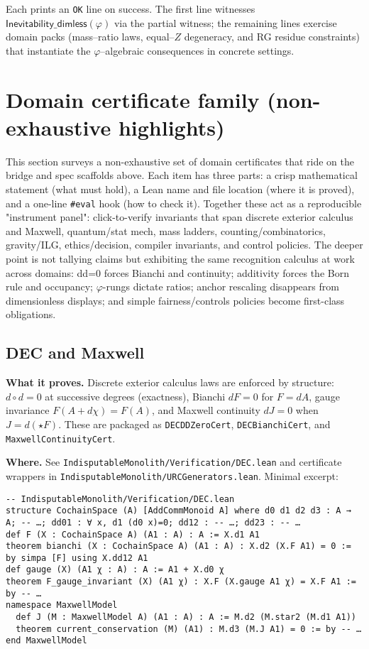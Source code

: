 \documentclass[11pt,a4paper,twoside]{article}
\numberwithin{equation}{section}
\newcommand{\phigr}{\varphi} %
\theoremstyle{customthm}
\theoremstyle{customdef}
\theoremstyle{customrem}
\begin{document}
\noindent Each prints an \texttt{OK} line on success. The first line witnesses $\mathsf{Inevitability\_dimless}(\phigr)$ via the partial witness; the remaining lines exercise domain packs (mass–ratio laws, equal–$Z$ degeneracy, and RG residue constraints) that instantiate the $\phigr$–algebraic consequences in concrete settings.

\section{Domain certificate family (non-exhaustive highlights)}\label{sec:domains}

This section surveys a non-exhaustive set of domain certificates that ride on the bridge and spec scaffolds above. Each item has three parts: a crisp mathematical statement (what must hold), a Lean name and file location (where it is proved), and a one-line \texttt{\#eval} hook (how to check it). Together these act as a reproducible "instrument panel": click-to-verify invariants that span discrete exterior calculus and Maxwell, quantum/stat mech, mass ladders, counting/combinatorics, gravity/ILG, ethics/decision, compiler invariants, and control policies. The deeper point is not tallying claims but exhibiting the same recognition calculus at work across domains: dd=0 forces Bianchi and continuity; additivity forces the Born rule and occupancy; $\phigr$-rungs dictate ratios; anchor rescaling disappears from dimensionless displays; and simple fairness/controls policies become first-class obligations.

\subsection{DEC and Maxwell}

\textbf{What it proves.} Discrete exterior calculus laws are enforced by structure: \(d\circ d=0\) at successive degrees (exactness), Bianchi \(dF=0\) for \(F=dA\), gauge invariance \(F(A+d\chi)=F(A)\), and Maxwell continuity \(dJ=0\) when \(J=d(\star F)\). These are packaged as \texttt{DECDDZeroCert}, \texttt{DECBianchiCert}, and \texttt{MaxwellContinuityCert}.

\textbf{Where.} See \texttt{IndisputableMonolith/Verification/DEC.lean} and certificate wrappers in \texttt{IndisputableMonolith/URCGenerators.lean}. Minimal excerpt:

\begin{lstlisting}
-- IndisputableMonolith/Verification/DEC.lean
structure CochainSpace (A) [AddCommMonoid A] where d0 d1 d2 d3 : A → A; -- …; dd01 : ∀ x, d1 (d0 x)=0; dd12 : -- …; dd23 : -- …
def F (X : CochainSpace A) (A1 : A) : A := X.d1 A1
theorem bianchi (X : CochainSpace A) (A1 : A) : X.d2 (X.F A1) = 0 := by simpa [F] using X.dd12 A1
def gauge (X) (A1 χ : A) : A := A1 + X.d0 χ
theorem F_gauge_invariant (X) (A1 χ) : X.F (X.gauge A1 χ) = X.F A1 := by -- …
namespace MaxwellModel
  def J (M : MaxwellModel A) (A1 : A) : A := M.d2 (M.star2 (M.d1 A1))
  theorem current_conservation (M) (A1) : M.d3 (M.J A1) = 0 := by -- …
end MaxwellModel
\end{lstlisting}
\end{document}
